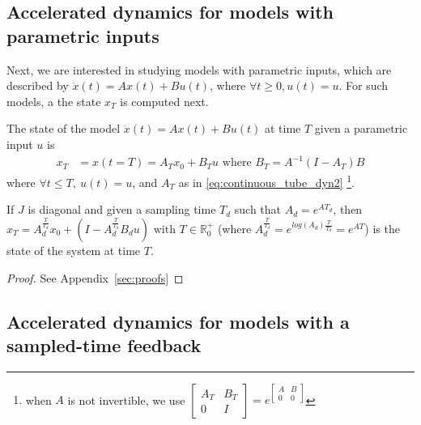 \documentclass[sigconf]{llncs}
\newcommand{\mat}[1]{{#1}}
\renewcommand{\vec}[1]{{#1}}
\begin{document}
 \subsection{Accelerated dynamics for models with parametric inputs}\label{sec:real_discrete_param_inputs}
 Next, we are interested in studying models with parametric inputs, 
 which are described by $\dot{\vec{x}}(t)=\mat{A}\vec{x}(t)+\mat{B}\vec{u}(t)$, where $\forall t\geq 0, \vec{u}(t)=\vec{u}$. 
 For such models, a the state $\vec{x}_T$ is computed next.  
\begin{theorem}
The state of the model $\dot{\vec{x}}(t)=\mat{A}\vec{x}(t)+\mat{B}\vec{u}(t)$ at time $T$ given a parametric input $\vec{u}$ is 
 \begin{align}
 \vec{x}_T&=\vec{x}(t=T)=\mat{A}_T\vec{x}_0 + \mat{B}_T\vec{u} \text{ where } \mat{B}_T=\mat{A}^{-1}(\mat{I}-\mat{A}_T)\mat{B} 
 \end{align}
 where $\forall t \leq T,\ \vec{u}(t)=\vec{u}$, and $\mat{A}_T$ as in \eqref{eq:continuous_tube_dyn2}
 \footnote{when $\mat{A}$ is not invertible, we use $\left[\begin{array}{cc}\mat{A}_T&\mat{B}_T\\ 0&\mat{I}\end{array}\right]=e^{\left[\begin{array}{cc}\mat{A}&\mat{B}\\0&0\end{array}\right]}$}.
 \end{theorem}
 \begin{corollary}
 If $\mat{J}$ is diagonal and given a sampling time $T_d$ such that $A_d=e^{\mat{A} T_d}$, 
 then $\vec{x}_T=A_d^{\frac{T}{T_d}}\vec{x}_0+(\mat{I}-\mat{A}_d^{\frac{T}{T_d}}\mat{B}_d\vec{u}) \text{ with } T \in \mathbb{R}_0^+$ (where $\mat{A}_d^{\frac{T}{T_d}} = e^{log(\mat{A}_d) \frac{T}{T_d}} = e^{\mat{A} T}$) is the state of the system at time $T$.
 \end{corollary}
\begin{proof}
See Appendix~\ref{sec:proofs}
\end{proof}

 \subsection{Accelerated dynamics for models with a sampled-time feedback}\label{sec:real_discrete_feedback_inputs}
\end{document}

